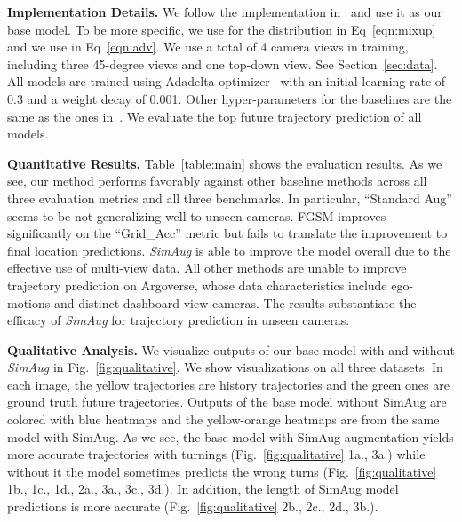 \documentclass[runningheads]{eccv2020/llncs}
\newcommand{\fancyname}{SimAug}
\begin{document}
\noindent\textbf{Implementation Details.}
We follow the implementation in~\cite{liang2020garden} and use it as our base model.
To be more specific, we use  for the  distribution in Eq~\eqref{eqn:mixup} and we use  in Eq~\eqref{eqn:adv}.
We use a total of 4 camera views in training, including three 45-degree views and one top-down view. See Section~\ref{sec:data}.
All models are trained using Adadelta optimizer~\cite{zeiler2012adadelta} with an initial learning rate of 0.3 and a weight decay of 0.001.
Other hyper-parameters for the baselines are the same as the ones in~\cite{liang2020garden}.
We evaluate the top  future trajectory prediction of all models.


\noindent\textbf{Quantitative Results.}
Table~\ref{table:main} shows the evaluation results. 
As we see, our method performs favorably against other baseline methods across all three evaluation metrics and all three benchmarks. 
In particular, ``Standard Aug'' seems to be not generalizing well to unseen cameras.
FGSM improves significantly on the ``Grid\_Acc'' metric but fails to translate the improvement to final location predictions. 
\textit{\fancyname} is able to improve the model overall due to the effective use of multi-view data.
All other methods are unable to improve trajectory prediction on Argoverse, whose data characteristics include ego-motions and distinct dashboard-view cameras. 
The results substantiate the efficacy of \textit{\fancyname} for trajectory prediction in unseen cameras.

\noindent\textbf{Qualitative Analysis.}
We visualize outputs of our base model with and without \textit{\fancyname} in Fig.~\ref{fig:qualitative}. We show visualizations on all three datasets. 
In each image, the yellow trajectories are history trajectories and the green ones are ground truth future trajectories. Outputs of the base model without {\fancyname} are colored with blue heatmaps and the yellow-orange heatmaps are from the same model with {\fancyname}.
As we see, the base model with {\fancyname} augmentation yields more accurate trajectories with turnings (Fig.~\ref{fig:qualitative} 1a., 3a.) while without it the model sometimes predicts the wrong turns (Fig.~\ref{fig:qualitative} 1b., 1c., 1d., 2a., 3a., 3c., 3d.).
In addition, the length of {\fancyname} model predictions is more accurate (Fig.~\ref{fig:qualitative} 2b., 2c., 2d., 3b.).
\end{document}
